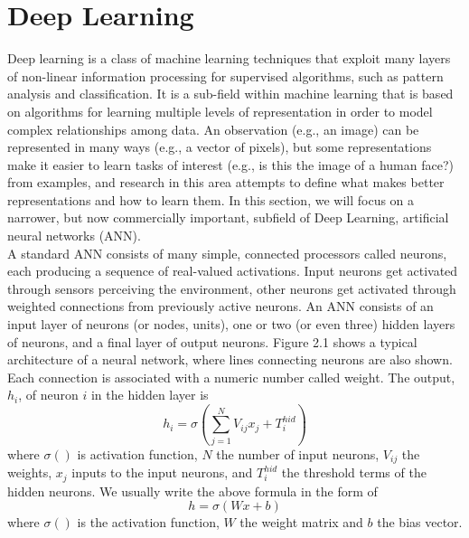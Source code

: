 \documentclass[12pt]{report} %
\begin{document}
\section{Deep Learning}
Deep learning is a class of machine learning techniques that exploit many layers of non-linear information processing for supervised algorithms, such as pattern analysis and classification. It is a sub-field within machine learning that is based on algorithms for learning multiple levels of representation in order to model complex relationships among data. An observation (e.g., an image) can be represented in many ways (e.g., a vector of pixels), but some representations make it easier to learn tasks of interest (e.g.,
is this the image of a human face?) from examples, and research in this area attempts to define what makes better representations and how to learn them\cite{DL}. In this section, we will focus on a narrower, but now commercially important, subfield of Deep Learning,  artificial neural networks (ANN).\\
A standard ANN consists of many simple, connected processors called neurons, each producing a sequence of real-valued activations. Input neurons get activated through sensors perceiving the environment, other neurons get activated through weighted connections from previously active neurons\cite{NN}. An ANN consists of an input layer of neurons (or nodes, units), one or two (or even three) hidden layers of neurons, and a final layer of output neurons. Figure 2.1 shows a typical architecture of a neural network, where lines connecting neurons are also shown. Each connection is associated with a numeric number called weight. The output, $h_{i}$, of neuron $i$ in the hidden layer is
\begin{equation}
h_{i}=\sigma(\sum _{j=1}^{N}V_{ij}x_{j}+T_{i}^{hid})
\end{equation}
where $\sigma()$ is activation function, $N$ the number of input neurons,  $V_{ij}$ the weights, $x_{j}$ inputs to the input neurons, and $T_{i}^{hid}$ the threshold terms of the hidden neurons\cite{NN2}. We usually write the above formula in the form of
\begin{equation}
h=\sigma(Wx+b)
\end{equation}
where $\sigma()$ is the activation function, $W$ the weight matrix and $b$ the bias vector.
\end{document}
